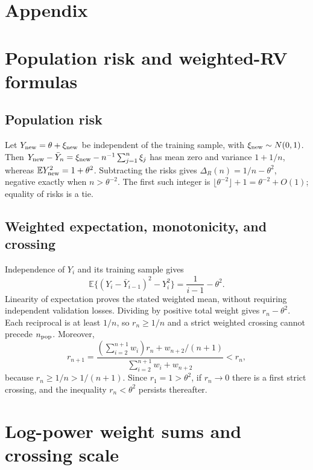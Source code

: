 \documentclass[11pt]{article}
\theoremstyle{definition}
\begin{document}
\appendix
\setlength{\abovedisplayskip}{7pt plus 2pt minus 2pt}
\setlength{\belowdisplayskip}{7pt plus 2pt minus 2pt}
\section*{Appendix}
\section{Population risk and weighted-RV formulas}
\subsection{Population risk}\label{app:population}
Let $Y_{\rm new}=\theta+\xi_{\rm new}$ be independent of the training
sample, with $\xi_{\rm new}\sim N(0,1)$. Then
$Y_{\rm new}-\bar Y_n=\xi_{\rm new}-n^{-1}\sum_{j=1}^n\xi_j$
has mean zero and variance $1+1/n$, whereas
$\mathbb EY_{\rm new}^2=1+\theta^2$. Subtracting the risks gives
$\Delta_R(n)=1/n-\theta^2$, negative exactly when $n>\theta^{-2}$.
The first such integer is $\lfloor\theta^{-2}\rfloor+1
=\theta^{-2}+O(1)$; equality of risks is a tie.

\subsection{Weighted expectation, monotonicity, and crossing}\label{app:weighted}
Independence of $Y_i$ and its training sample gives
\[
\mathbb E\{(Y_i-\bar Y_{i-1})^2-Y_i^2\}
=\frac1{i-1}-\theta^2.
\]
Linearity of expectation proves the stated weighted mean, without
requiring independent validation losses. Dividing by positive total
weight gives $r_n-\theta^2$. Each reciprocal is at least $1/n$,
so $r_n\ge1/n$ and a strict weighted crossing cannot precede
$n_{\rm pop}$. Moreover,
\[
r_{n+1}=
\frac{(\sum_{i=2}^{n+1}w_i)r_n+w_{n+2}/(n+1)}
{\sum_{i=2}^{n+1}w_i+w_{n+2}}<r_n,
\]
because $r_n\ge1/n>1/(n+1)$. Since $r_1=1>\theta^2$, if
$r_n\to0$ there is a first strict crossing, and the inequality
$r_n<\theta^2$ persists thereafter.

\section{Log-power weight sums and crossing scale}
\end{document}
